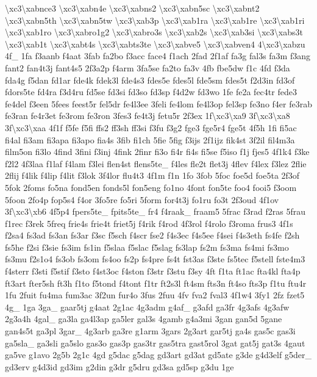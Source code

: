 {\textbackslash{}xc3\textbackslash{}xabnce3 \textbackslash{}xc3\textbackslash{}xabn4e \textbackslash{}xc3\textbackslash{}xabns2 \textbackslash{}xc3\textbackslash{}xabn5sc \textbackslash{}xc3\textbackslash{}xabnt2 \textbackslash{}xc3\textbackslash{}xabn5th \textbackslash{}xc3\textbackslash{}xabn5tw \textbackslash{}xc3\textbackslash{}xab3p \textbackslash{}xc3\textbackslash{}xab1ra \textbackslash{}xc3\textbackslash{}xab1re \textbackslash{}xc3\textbackslash{}xab1ri \textbackslash{}xc3\textbackslash{}xab1ro \textbackslash{}xc3\textbackslash{}xabro1g2 \textbackslash{}xc3\textbackslash{}xabro3s \textbackslash{}xc3\textbackslash{}xab2s \textbackslash{}xc3\textbackslash{}xab3si \textbackslash{}xc3\textbackslash{}xabs3t \textbackslash{}xc3\textbackslash{}xab1t \textbackslash{}xc3\textbackslash{}xabt4s \textbackslash{}xc3\textbackslash{}xabts3te \textbackslash{}xc3\textbackslash{}xabve5 \textbackslash{}xc3\textbackslash{}xabven4 4\textbackslash{}xc3\textbackslash{}xabzu 4f\-\_\- 1fa f3aanb f4aat 3fab fa2bo f3acc face4 f1ach 2fad 2f1af fa3g fal3s fa3m f3ang fant2 fan4t3j fant4s5 2f3a2p f4arm 3fa5se fa2to fa3v 4fb fbe5dw f1c 4fd f3da fda4g f5dan fd1ar fde4k fdek3l fde4s3 fdes5e fdes5l fde5sm fdes5t f2d3in fd3of fdors5te fd4ra f3d4ru fd5se fd3si fd3so fd3sp f4d2w fd3wo 1fe fe2a fec4tr fede3 fe4del f3een 5fees feest5r fel5dr fe4l3ee 3feli fe4lom fe4l3op fel3sp fe3no f4er fe3rab fe3ran fe4r3et fe3rom fe3ron 3fes3 fe4t3j fetu5r 2f3ex 1f\textbackslash{}xc3\textbackslash{}xa9 3f\textbackslash{}xc3\textbackslash{}xa8 3f\textbackslash{}xc3\textbackslash{}xaa 4f1f f5fe f5fi ffs2 ff3sh ff3si f3fu f3g2 fge3 fge5r4 fge5t 4f5h 1fi fi5ac fi4al fi3am fi3apa fi3apo fia4s 3fib fi1ch 5fie 5fig f3ijs 2f1ijz fik4st 3f2il fil4m3a film5on fi3lo 4find 3fini f3inj 4fink 2finr fi3o fi4r fi4s fi5se f5iso f1j fjes5 4f1k4 f3ke f2l2 4f3laa f1laf f4lam f3lei flen4st flens5te\-\_\- f4les fle2t flet3j 4flev f4lex f3lez 2flie 2flij f4lik f4lip f4lit f3lok 3f4lor flu4t3 4f1m f1n 1fo 3fob 5foc foe5d foe5ta 2f3of 5fok 2foms fo5na fond5en fonds5l fon5eng fo1no 4font fon5te foo4 fooi5 f3oom 5foon 2fo4p fop5s4 f4or 3fo5re fo5ri 5form for4t3j fo1ru fo3t 2f3oud 4f1ov 3f\textbackslash{}xc3\textbackslash{}xb6 4f5p4 fpers5te\-\_\- fpits5te\-\_\- fr4 f4raak\-\_\- fraam5 5frac f3rad f2ras 5frau f1rec f3rek 5freq frie4s frie4t friet5j f4rik f4rod 4f3rol f4rolo f3roma frus3 4f1s f2sa4 fs3ad fs3an fs3ar f3sc f5sch f4scr fse2 f4s3ec f4s5ee f4sei f4s3eth fs4fe f2sh fs5he f2si f3sie fs3im fs1in f5slaa f5slac f5slag fs3lap fs2m fs3ma fs4mi fs3mo fs3mu f2s1o4 fs3ob fs3om fs4oo fs2p fs4pre fs4t fst3as f3ste fs5tec f5stell fste4m3 f4sterr f3sti f5stif f3sto f4st3oc f4ston f3str f3stu f3sy 4ft f1ta ft1ac fta4kl fta4p ft3art fter5sh ft3h f1to f5tond f4tont f1tr ft2s3l ft4sm fts3n ft4so fts3p f1tu ftu4r 1fu 2fuit fu4ma fum3ac 3f2un fur4o 3fus 2fuu 4fv fva2 fval3 4f1w4 3fy1 2fz fzet5 4g\-\_\- 1ga 3ga\-\_\- gaar5tj g4aat 2g1ac 4g3adm g4af\-\_\- g3afd ga3fr 4g3afs 4g3afw 2g3a4h 4gal\-\_\- ga3la ga4l3ap ga5ler gal3s 4gamb g4a3mi 3gan gan5d 5gane gan4s5t ga3pl 3gar\-\_\- 4g3arb ga3re g1arm 3gars 2g3art gar5tj ga4s gas5c gas3i ga5sla\-\_\- ga3sli ga5slo gas3o gas3p gas3tr gas5tra gast5rol 3gat gat5j gat3s 4gaut ga5ve g1avo 2g5b 2g1c 4gd g5dac g5dag gd3art gd3at gd5ate g3de g4d3elf g5der\-\_\- gd3erv g4d3id gd3im g2din g3dr g5dru gd3sa gd5sp g3du 1ge }
